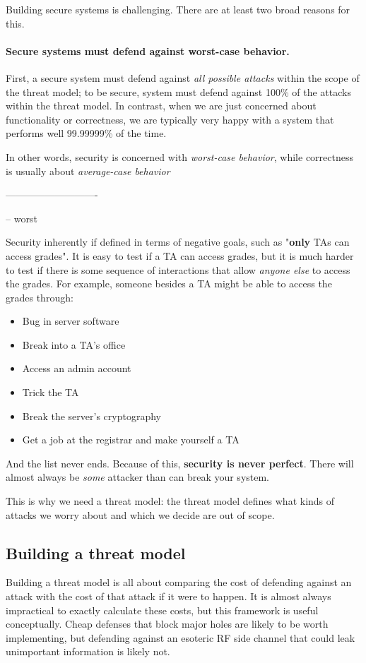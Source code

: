 Building secure systems is challenging.
There are at least two broad reasons for this.

\paragraph{Secure systems must defend against worst-case behavior.}
First, a secure system must defend against
\emph{all possible attacks} within the scope of 
the threat model;
to be secure, system must defend against 100\% of the
attacks within the threat model.
In contrast, when we are just concerned about functionality or
correctness, we are typically very happy with a system 
that performs well 99.99999\% of the time.

In other words, security is concerned with \emph{worst-case behavior},
while correctness is usually about \emph{average-case behavior}


----------------------------

-- worst 


Security inherently if defined in terms of
negative goals, such as "\textbf{only} TAs can
access grades".
It is easy to test if a TA can
access grades, but it is much harder to test if
there is some sequence of interactions that allow
\textit{anyone else} to access the grades. For
example, someone besides a TA might be able to
access the grades through:

\begin{itemize}
	\item Bug in server software
	\item Break into a TA's office
	\item Access an admin account
	\item Trick the TA
	\item Break the server's cryptography
	\item Get a job at the registrar and make yourself a TA
\end{itemize}

And the list never ends. Because of this, \textbf{security is never perfect}. There will almost always be \textit{some} attacker than can break your system.

This is why we need a threat model: the threat model defines what kinds of attacks we worry about and which we decide are out of scope.

\subsection{Building a threat model}
Building a threat model is all about comparing the cost of defending against an attack with the cost of that attack if it were to happen. It is almost always impractical to exactly calculate these costs, but this framework is useful conceptually. Cheap defenses that block major holes are likely to be worth implementing, but defending against an esoteric RF side channel that could leak unimportant information is likely not.

